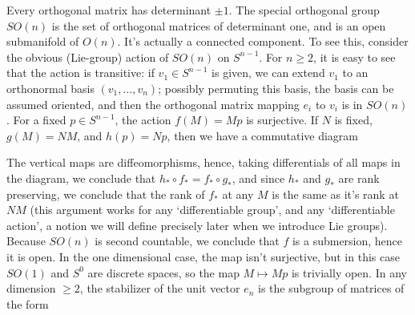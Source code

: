\begin{example}
    Every orthogonal matrix has determinant $\pm 1$. The special orthogonal group $SO(n)$ is the set of orthogonal matrices of determinant one, and is an open submanifold of $O(n)$. It's actually a connected component. To see this, consider the obvious (Lie-group) action of $SO(n)$ on $S^{n-1}$. For $n \geq 2$, it is easy to see that the action is transitive: if $v_1 \in S^{n-1}$ is given, we can extend $v_1$ to an orthonormal basis $(v_1, \dots, v_n)$; possibly permuting this basis, the basis can be assumed oriented, and then the orthogonal matrix mapping $e_i$ to $v_i$ is in $SO(n)$.
    For a fixed $p \in S^{n-1}$, the action $f(M) = Mp$ is surjective. If $N$ is fixed, $g(M) = NM$, and $h(p) = Np$, then we have a commutative diagram
    \begin{center}
    \end{center}
    The vertical maps are diffeomorphisms, hence, taking differentials of all maps in the diagram, we conclude that $h_* \circ f_* = f_* \circ g_*$, and since $h_*$ and $g_*$ are rank preserving, we conclude that the rank of $f_*$ at any $M$ is the same as it's rank at $NM$ (this argument works for any `differentiable group', and any `differentiable action', a notion we will define precisely later when we introduce Lie groups). Because $SO(n)$ is second countable, we conclude that $f$ is a submersion, hence it is open. In the one dimensional case, the map isn't surjective, but in this case $SO(1)$ and $S^0$ are discrete spaces, so the map $M \mapsto Mp$ is trivially open. In any dimension $\geq 2$, the stabilizer of the unit vector $e_n$ is the subgroup of matrices of the form

\end{example}
